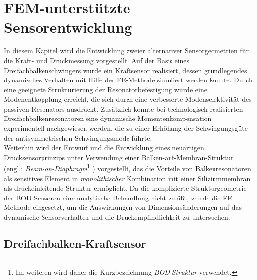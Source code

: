 \chapter{FEM-unterstützte Sensorentwicklung}
\label{alternativesensorstrukturen}

In diesem Kapitel wird die Entwicklung zweier alternativer
Sensorgeometrien für die Kraft- und Druckmessung vorgestellt.
Auf der Basis eines Dreifachbalkenschwingers wurde ein
Kraftsensor realisiert, dessen grundlegendes dynamisches Verhalten
mit Hilfe der FE-Methode simuliert werden konnte. Durch eine geeignete
Strukturierung der Resonatorbefestigung wurde eine Modenentkopplung
erreicht, die sich durch eine verbesserte Modenselektivität des passiven
Resonators ausdrückt. Zusätzlich konnte bei technologisch realisierten
Dreifachbalkenresonatoren eine dynamische Momentenkompensation experimentell
nachgewiesen werden, die zu einer Erhöhung der Schwingungsgüte der
antisymmetrischen Schwingungsmode führte. \\
%
Weiterhin wird der Entwurf und die Entwicklung eines neuartigen
Drucksensorprinzips unter Verwendung einer
\glqq Balken-auf-Membran\grqq-Struktur (engl.:
{\em Beam-on-Diaphragm}\footnote{Im weiteren wird daher die
Kurzbezeichnung {\em BOD-Struktur} verwendet.} \cite{Tho90}) vorgestellt,
das die Vorteile von Balkenresonatoren als sensitives Element in
{\em monolithischer} Kombination mit einer Siliziummembran als
druckeinleitende Struktur ermöglicht. Da die komplizierte Strukturgeometrie
der BOD-Sensoren eine analytische Behandlung nicht zuläßt, wurde die
FE-Methode eingesetzt, um die Auswirkungen von Dimensionsänderungen auf das
dynamische Sensorverhalten und die Druckempfindlichkeit zu untersuchen.



\section{Dreifachbalken-Kraftsensor}
\label{dreifachbalken}

